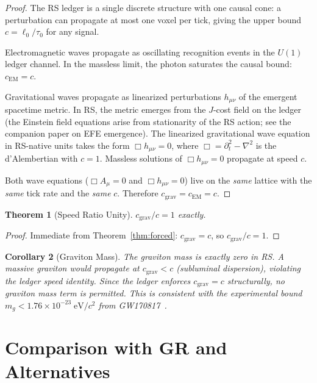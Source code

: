 \documentclass[12pt,a4paper]{article}
\newtheorem{theorem}{Theorem}[section]
\newtheorem{corollary}[theorem]{Corollary}
\theoremstyle{definition}
\theoremstyle{remark}
\begin{document}
\begin{proof}
The RS ledger is a single discrete structure with one causal cone:
a perturbation can propagate at most one voxel per tick, giving the
upper bound $c = \ell_0/\tau_0$ for any signal.

Electromagnetic waves propagate as oscillating recognition events
in the $U(1)$ ledger channel.  In the massless limit, the photon
saturates the causal bound: $c_{\mathrm{EM}} = c$.

Gravitational waves propagate as linearized perturbations
$h_{\mu\nu}$ of the emergent spacetime metric.  In RS, the metric
emerges from the $J$-cost field on the ledger (the Einstein field
equations arise from stationarity of the RS action; see the
companion paper on EFE emergence).  The linearized gravitational
wave equation in RS-native units takes the form
$\Box h_{\mu\nu} = 0$, where $\Box = \partial_t^2 - \nabla^2$
is the d'Alembertian with $c = 1$.  Massless solutions of
$\Box h_{\mu\nu} = 0$ propagate at speed $c$.

Both wave equations ($\Box A_\mu = 0$ and $\Box h_{\mu\nu} = 0$)
live on the \emph{same} lattice with the \emph{same} tick rate and
the \emph{same} $c$.  Therefore $c_{\mathrm{grav}} = c_{\mathrm{EM}} = c$.
\end{proof}

\begin{theorem}[Speed Ratio Unity]
\label{thm:ratio}
$c_{\mathrm{grav}}/c = 1$ exactly.
\end{theorem}

\begin{proof}
Immediate from Theorem~\ref{thm:forced}: $c_{\mathrm{grav}} = c$,
so $c_{\mathrm{grav}}/c = 1$.
\end{proof}

\begin{corollary}[Graviton Mass]
\label{cor:graviton}
The graviton mass is exactly zero in RS.  A massive graviton would
propagate at $c_{\mathrm{grav}} < c$ (subluminal dispersion), violating
the ledger speed identity.  Since the ledger enforces
$c_{\mathrm{grav}} = c$ structurally, no graviton mass term is
permitted.  This is consistent with the experimental bound
$m_g < 1.76 \times 10^{-23}\;\mathrm{eV}/c^2$
from GW170817~\cite{deRham2017}.
\end{corollary}

\section{Comparison with GR and Alternatives}
\label{sec:compare}
\end{document}
